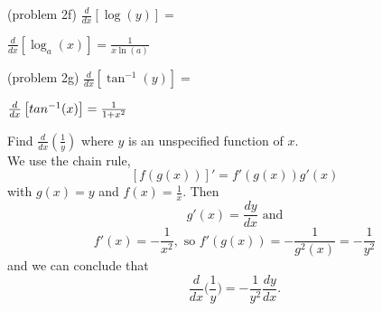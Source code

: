 \documentclass{ximera}
\begin{document}
\begin{problem}(problem 2f)
$\displaystyle{\frac{d}{dx} \left[\log(y)\right]=}$
 
\begin{multipleChoice}
\end{multipleChoice}
	  
    
    \begin{hint}
      $\frac{d}{dx}\left[\log_a(x)\right] = \frac{1}{x\ln(a)}$
    \end{hint}
    
\end{problem}

\begin{problem}(problem 2g)
$\displaystyle{\frac{d}{dx} \left[\tan^{-1}(y)\right]=}$
 
\begin{multipleChoice}
\end{multipleChoice}
	   
    \begin{hint}
      $\frac{d}{dx}\left[\\tan^{-1}(x)\right] = \frac{1}{1+x^2}$
    \end{hint}
    
\end{problem}


\begin{example}[example 3]
Find $\frac{d}{dx} \left(\frac{1}{y}\right)$ where $y$ is an unspecified function of $x$.\\
We use the chain rule,
\[\displaystyle{[f(g(x))]' = f'(g(x))g'(x)}\]
with $g(x) = y$ and $f(x) = \frac{1}{x}$. Then 
\[g'(x) = \frac{dy}{dx} \text{ and}\]
\[f'(x) = -\frac{1}{x^2}, \text{ so } f'(g(x)) = -\frac{1}{g^2(x)} = -\frac{1}{y^2}\]
and we can conclude that
\[\frac{d}{dx} \Big(\frac{1}{y}\Big) = -\frac{1}{y^2} \frac{dy}{dx}.\]
\end{example}


\begin{center}
\begin{foldable}
\end{foldable}
\end{center}
\end{document}
